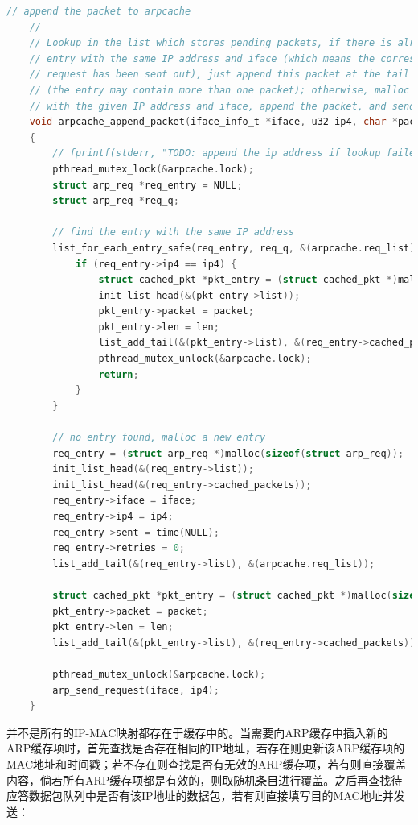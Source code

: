 \documentclass[UTF8]{report}
\begin{document}
\begin{lstlisting}[language=C]
    // append the packet to arpcache
    //
    // Lookup in the list which stores pending packets, if there is already an
    // entry with the same IP address and iface (which means the corresponding arp
    // request has been sent out), just append this packet at the tail of that entry
    // (the entry may contain more than one packet); otherwise, malloc a new entry
    // with the given IP address and iface, append the packet, and send arp request.
    void arpcache_append_packet(iface_info_t *iface, u32 ip4, char *packet, int len)
    {
        // fprintf(stderr, "TODO: append the ip address if lookup failed, and send arp request if necessary.\n");
        pthread_mutex_lock(&arpcache.lock);
        struct arp_req *req_entry = NULL;
        struct arp_req *req_q;
    
        // find the entry with the same IP address
        list_for_each_entry_safe(req_entry, req_q, &(arpcache.req_list), list) {
            if (req_entry->ip4 == ip4) {
                struct cached_pkt *pkt_entry = (struct cached_pkt *)malloc(sizeof(struct cached_pkt));
                init_list_head(&(pkt_entry->list));
                pkt_entry->packet = packet;
                pkt_entry->len = len;
                list_add_tail(&(pkt_entry->list), &(req_entry->cached_packets));
                pthread_mutex_unlock(&arpcache.lock);
                return;
            }
        }
    
        // no entry found, malloc a new entry
        req_entry = (struct arp_req *)malloc(sizeof(struct arp_req));
        init_list_head(&(req_entry->list));
        init_list_head(&(req_entry->cached_packets));
        req_entry->iface = iface;
        req_entry->ip4 = ip4;
        req_entry->sent = time(NULL);
        req_entry->retries = 0;
        list_add_tail(&(req_entry->list), &(arpcache.req_list));
    
        struct cached_pkt *pkt_entry = (struct cached_pkt *)malloc(sizeof(struct cached_pkt));
        pkt_entry->packet = packet;
        pkt_entry->len = len;
        list_add_tail(&(pkt_entry->list), &(req_entry->cached_packets));
    
        pthread_mutex_unlock(&arpcache.lock);
        arp_send_request(iface, ip4);
    }
\end{lstlisting}

并不是所有的IP-MAC映射都存在于缓存中的。当需要向ARP缓存中插入新的ARP缓存项时，首先查找是否存在相同的IP地址，若存在则更新该ARP缓存项的MAC地址和时间戳；若不存在则查找是否有无效的ARP缓存项，若有则直接覆盖内容，倘若所有ARP缓存项都是有效的，则取随机条目进行覆盖。之后再查找待应答数据包队列中是否有该IP地址的数据包，若有则直接填写目的MAC地址并发送：
\end{document}
